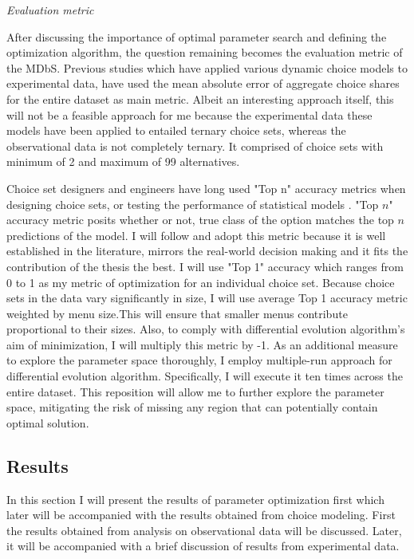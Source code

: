 \documentclass[a4paper,12pt]{article}
\begin{document}
\textit{Evaluation metric}

After discussing the importance of optimal parameter search and defining the optimization algorithm, the question remaining becomes the evaluation metric of the MDbS. Previous studies which have applied various dynamic choice models to experimental data, have used the mean absolute error of aggregate choice shares for the entire dataset as main metric. Albeit an interesting approach itself, this will not be a feasible approach for me because the experimental data these models have been applied to entailed ternary choice sets, whereas the observational data is not completely ternary. It comprised of choice sets with minimum of 2 and maximum of 99 alternatives. 

Choice set designers and engineers have long used "Top n" accuracy metrics when designing choice sets, or testing the performance of statistical models \citep{ricci2015recommender}. "Top $n$" accuracy metric posits whether or not, true class of the option matches the top $n$ predictions of the model. I will follow and adopt this metric because it is well established in the literature, mirrors the real-world decision making and it fits the contribution of the thesis the best. I will use "Top 1" accuracy which ranges from 0 to 1 as my metric of optimization for an individual choice set. Because choice sets in the data vary significantly in size, I will use average Top 1 accuracy metric weighted by menu size.This will ensure that smaller menus contribute proportional to their sizes. Also, to comply with differential evolution algorithm's aim of minimization, I will multiply this metric by -1. As an additional measure to explore the parameter space thoroughly, I employ multiple-run approach for differential evolution algorithm. Specifically, I will execute it ten times across the entire dataset. This reposition will allow me to further explore the parameter space, mitigating the risk of missing any region that can potentially contain optimal solution.


\subsection{Results}

In this section I will present the results of parameter optimization first which later will be accompanied with the results obtained from choice modeling. First the results obtained from analysis on observational data will be discussed. Later, it will be accompanied with a brief discussion of results from experimental data.
\end{document}
